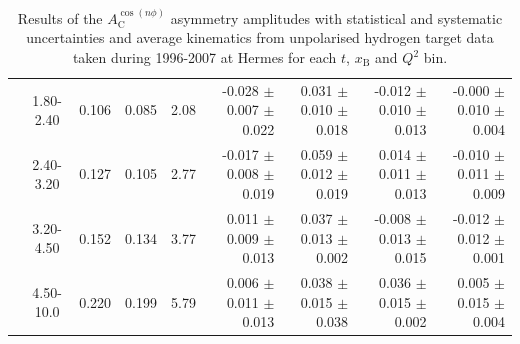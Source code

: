 \documentclass[11pt,a4paper]{article}
\begin{document}
\begin{table}[width=15cm]
\begin{center}
{\begin{tabular}{|c|c|c|c|c|r|r|r|r|}
& 1.80-2.40 &  0.106 & 0.085 &  2.08 &  -0.028  $\pm$  0.007  $\pm$   0.022 &
 0.031  $\pm$  0.010  $\pm$   0.018 & -0.012 $\pm$   0.010  $\pm$  0.013 & -0.000  $\pm$   0.010  $\pm$  0.004\\
& 2.40-3.20 &  0.127 &  0.105 & 2.77 &  -0.017 $\pm$   0.008  $\pm$   0.019 &  
0.059  $\pm$  0.012  $\pm$   0.019 & 0.014  $\pm$  0.011  $\pm$  0.013 & -0.010  $\pm$  0.011  $\pm$  0.009\\
& 3.20-4.50 &   0.152 & 0.134 &  3.77 &  0.011  $\pm$  0.009   $\pm$  0.013 & 
0.037 $\pm$   0.013  $\pm$   0.002 & -0.008  $\pm$  0.013 $\pm$ 0.015 & -0.012   $\pm$  0.012  $\pm$  0.001\\
& 4.50-10.0 & 0.220  & 0.199 & 5.79  &  0.006  $\pm$  0.011  $\pm$   0.013 & 
0.038  $\pm$  0.015  $\pm$  0.038 & 0.036 $\pm$   0.015  $\pm$  0.002 & 0.005   $\pm$  0.015   $\pm$   0.004\\
\hline
  \end{tabular}
}
 \end{center}
\caption{Results of the $A_{\textrm{C}}^{\cos(n\phi)}$ asymmetry amplitudes with statistical and systematic uncertainties and average kinematics from unpolarised hydrogen target data taken during 1996-2007 at H{\sc ermes} for each $t$, $x_{\textrm{B}}$ and $Q^{2}$ bin.}
\end{table}
\end{document}
